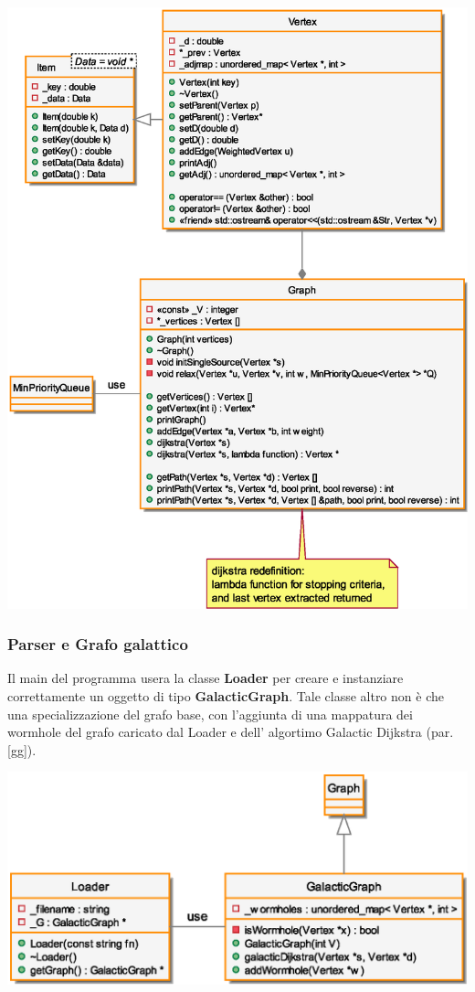 \begin{center}
\includegraphics[scale=0.7]{tesina_tex/spacegraph/2img/g.eps}
\end{center}

\newpage
\subsubsection{Parser e Grafo galattico}
\indent Il main del programma usera la classe \textbf{Loader} per creare e instanziare correttamente un oggetto di
tipo \textbf{GalacticGraph}. Tale classe altro non \`e che una specializzazione del grafo base, con l'aggiunta
di una mappatura dei wormhole del grafo caricato dal Loader e dell' algortimo Galactic Dijkstra (par. \ref{gg}).
\begin{center}
\includegraphics[scale=0.9]{tesina_tex/spacegraph/2img/gg.eps}
\end{center}
